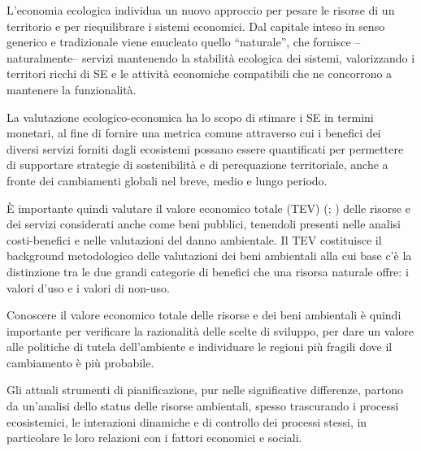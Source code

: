 \documentclass[12pt,a4paper]{article}
\begin{document}
	L'economia ecologica individua un nuovo approccio per pesare le risorse di un territorio e per riequilibrare i sistemi economici. Dal capitale inteso in senso generico e tradizionale viene enucleato quello ``naturale'', che fornisce --naturalmente-- servizi mantenendo la stabilità ecologica dei sistemi, valorizzando i territori ricchi di SE e le attività economiche compatibili che ne concorrono a mantenere la funzionalità. 
	
	La valutazione ecologico-economica ha lo scopo di stimare i SE in termini monetari, al fine di fornire una metrica comune	attraverso cui i benefici dei diversi servizi forniti dagli ecosistemi possano essere quantificati \cite{MEA_EcosystemsAndHumanWellBeing:Synthesis} per permettere di supportare strategie di sostenibilità e di perequazione territoriale, anche a fronte dei cambiamenti globali nel breve, medio e lungo periodo. 
	
	È importante quindi valutare il valore economico totale (TEV) (\cite{freeman2014measurement}; \cite{merlo2005valuing}) delle risorse e dei servizi considerati anche come beni pubblici, tenendoli presenti nelle analisi costi-benefici e nelle valutazioni del danno ambientale. Il TEV costituisce il background metodologico delle valutazioni dei beni ambientali alla cui base c'è la distinzione tra le due grandi categorie di benefici che una risorsa naturale offre: i valori d'uso e i valori di non-uso.  
	
	Conoscere il valore economico totale delle risorse e dei beni ambientali è quindi importante per verificare la razionalità delle scelte di sviluppo, per dare un valore alle politiche di tutela dell'ambiente e individuare le regioni più fragili dove il cambiamento è più probabile. 
	
	
	Gli attuali strumenti di pianificazione, pur nelle significative differenze, partono da un'analisi dello status delle risorse ambientali, spesso trascurando i processi ecosistemici, le interazioni dinamiche e di controllo dei processi stessi, in particolare le loro relazioni con i fattori economici e sociali. 
	
\end{document}
